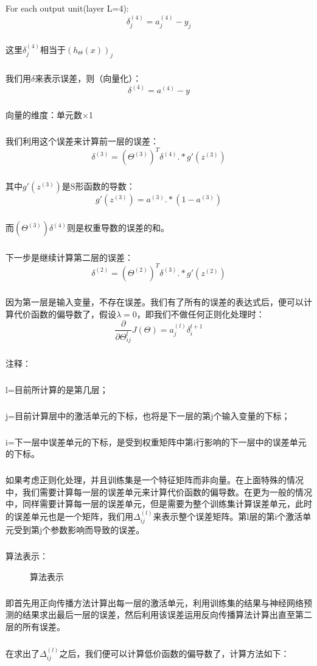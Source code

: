 \documentclass{article}
\begin{document}
\begin{CJK}{UTF8}{gbsn}
\subparagraph{}
For each output unit(layer L=4):
\begin{equation}
\delta_j^{(4)}=a_j^{(4)}-y_j
\end{equation}
\subparagraph{}
这里$\delta_j^{(4)}$相当于$(h_\Theta(x))_j$
\subparagraph{}
我们用$\delta$来表示误差，则（向量化）：
\begin{equation}
\delta^{(4)}=a^{(4)}-y
\end{equation}
\subparagraph{}
向量的维度：单元数×1
\subparagraph{}
我们利用这个误差来计算前一层的误差：
\begin{equation}
\delta^{(3)}=(\Theta^{(3)})^T\delta^{(4)}.*g'(z^{(3)})
\end{equation}
\subparagraph{}
其中$g'(z^{(3)})$是S形函数的导数：
\begin{equation}
g'(z^{(3)})=a^{(3)}.*(1-a^{(3)})
\end{equation}
\subparagraph{}
而$(\Theta^{(3)})\delta^{(4)}$则是权重导数的误差的和。
\subparagraph{}
下一步是继续计算第二层的误差：
\begin{equation}
\delta^{(2)}=(\Theta^{(2)})^T\delta^{(3)}.*g'(z^{(2)})
\end{equation}
\subparagraph{}
因为第一层是输入变量，不存在误差。我们有了所有的误差的表达式后，便可以计算代价函数的偏导数了，假设$\lambda=0$，即我们不做任何正则化处理时：
\begin{equation}
\frac{\partial}{\partial\Theta_{ij}^{l}}J(\Theta)=a_j^{(l)}\delta_i^{l+1}
\end{equation}
\subparagraph{}
注释：
\subparagraph{}
l=目前所计算的是第几层；
\subparagraph{}
j=目前计算层中的激活单元的下标，也将是下一层的第j个输入变量的下标；
\subparagraph{}
i=下一层中误差单元的下标，是受到权重矩阵中第i行影响的下一层中的误差单元的下标。
\subparagraph{}
如果考虑正则化处理，并且训练集是一个特征矩阵而非向量。在上面特殊的情况中，我们需要计算每一层的误差单元来计算代价函数的偏导数。在更为一般的情况中，同样需要计算每一层的误差单元，但是需要为整个训练集计算误差单元，此时的误差单元也是一个矩阵，我们用$\Delta_{ij}^{(l)}$来表示整个误差矩阵。第l层的第i个激活单元受到第j个参数影响而导致的误差。
\subparagraph{}
算法表示：
\begin{figure}[H]
\caption{算法表示}
\label{fig:506}
\end{figure}
\subparagraph{}
即首先用正向传播方法计算出每一层的激活单元，利用训练集的结果与神经网络预测的结果求出最后一层的误差，然后利用该误差运用反向传播算法计算出直至第二层的所有误差。
\subparagraph{}
在求出了$\Delta_{ij}^{(l)}$之后，我们便可以计算低价函数的偏导数了，计算方法如下：

\end{CJK}
\end{document}
